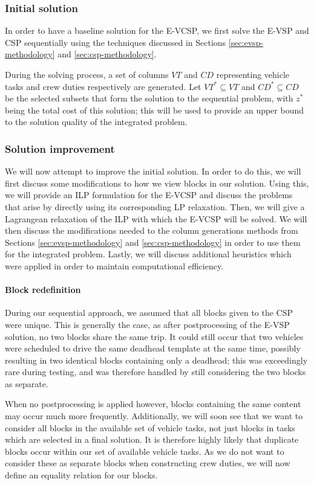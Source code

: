 \documentclass[]{article}
\begin{document}
\subsubsection{Initial solution}
In order to have a baseline solution for the E-VCSP, we first solve the E-VSP and CSP sequentially using the techniques discussed in Sections \ref{sec:evsp-methodology} and \ref{sec:csp-methodology}. 

During the solving process, a set of columns $VT$ and $CD$ representing vehicle tasks and crew duties respectively are generated. Let $VT^* \subseteq VT$ and $CD^* \subseteq CD$ be the selected subsets that form the solution to the sequential problem, with $z^*$ being the total cost of this solution; this will be used to provide an upper bound to the solution quality of the integrated problem. 

\subsubsection{Solution improvement}
We will now attempt to improve the initial solution. In order to do this, we will first discuss some modifications to how we view blocks in our solution. Using this, we will provide an ILP formulation for the E-VCSP and discuss the problems that arise by directly using its corresponding LP relaxation. Then, we will give a Lagrangean relaxation of the ILP with which the E-VCSP will be solved. We will then discuss the modifications needed to the column generations methods from Sections \ref{sec:evsp-methodology} and \ref{sec:csp-methodology} in order to use them for the integrated problem. Lastly, we will discuss additional heuristics which were applied in order to maintain computational efficiency. 

\paragraph{Block redefinition} During our sequential approach, we assumed that all blocks given to the CSP were unique. This is generally the case, as after postprocessing of the E-VSP solution, no two blocks share the same trip. It could still occur that two vehicles were scheduled to drive the same deadhead template at the same time, possibly resulting in two identical blocks containing only a deadhead; this was exceedingly rare during testing, and was therefore handled by still considering the two blocks as separate.

When no postprocessing is applied however, blocks containing the same content may occur much more frequently. Additionally, we will soon see that we want to consider all blocks in the available set of vehicle tasks, not just blocks in tasks which are selected in a final solution. It is therefore highly likely that duplicate blocks occur within our set of available vehicle tasks. As we do not want to consider these as separate blocks when constructing crew duties, we will now define an equality relation for our blocks. 
\end{document}
